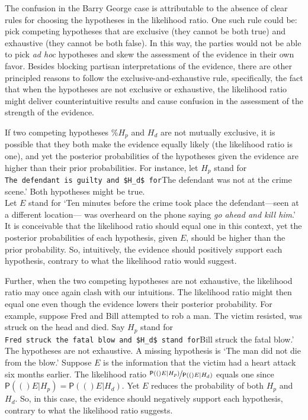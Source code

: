 \documentclass[10pt,dvipsnames,enabledeprecatedfontcommands]{scrartcl}
\newcommand{\pr}[1]{\mathsf{P}(#1)}
\begin{document}
The confusion in the Barry George case is attributable to the absence of
clear rules for choosing the hypotheses in the likelihood ratio. One
such rule could be: pick competing hypotheses that are exclusive (they
cannot be both true) and exhaustive (they cannot be both false). In this
way, the parties would not be able to pick \textit{ad hoc} hypotheses
and skew the assessment of the evidence in their own favor. Besides
blocking partisan interpretations of the evidence, there are other
principled reasons to follow the exclusive-and-exhaustive rule,
specifically, the fact that when the hypotheses are not exclusive or
exhaustive, the likelihood ratio might deliver counterintuitive results
and cause confusion in the assessment of the strength of the evidence.

If two competing hypotheses \%\(H_p\) and \(H_d\) are not mutually
exclusive, it is possible that they both make the evidence equally
likely (the likelihood ratio is one), and yet the posterior
probabilities of the hypotheses given the evidence are higher than their
prior probabilities. For instance, let \(H_p\) stand for
\texttt{The\ defendant\ is\ guilty\textquotesingle{}\ and\ \$H\_d\$\ for}The
defendant was not at the crime scene.' Both hypotheses might be true.\\
Let \(E\) stand for `Ten minutes before the crime took place the
defendant---seen at a different location--- was overheard on the phone
saying \emph{go ahead and kill him}.' It is conceivable that the
likelihood ratio should equal one in this context, yet the posterior
probabilities of each hypothesis, given \(E\), should be higher than the
prior probability. So, intuitively, the evidence should positively
support each hypothesis, contrary to what the likelihood ratio would
suggest.

Further, when the two competing hypotheses are not exhaustive, the
likelihood ratio may once again clash with our intuitions. The
likelihood ratio might then equal one even though the evidence lowers
their posterior probability. For example, suppose Fred and Bill
attempted to rob a man. The victim resisted, was struck on the head and
died. Say \(H_p\) stand for
\texttt{Fred\ struck\ the\ fatal\ blow\textquotesingle{}\ and\ \$H\_d\$\ stand\ for}Bill
struck the fatal blow.' The hypotheses are not exhaustive. A missing
hypothesis is `The man did not die from the blow.' Suppose \(E\) is the
information that the victim had a heart attack six months earlier. The
likelihood ratio \(\nicefrac{\pr(E \vert H_p)}{\pr(E \vert H_d)}\)
equals one since \(\pr(E\vert H_p)=\pr(E\vert H_d)\). Yet \(E\) reduces
the probability of both \(H_p\) and \(H_d\). So, in this case, the
evidence should negatively support each hypothesis, contrary to what the
likelihood ratio suggests.
\end{document}
